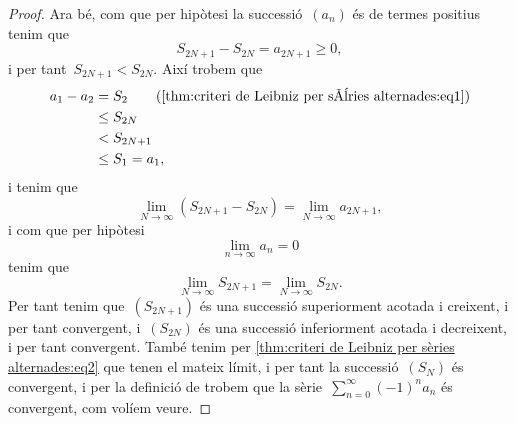 \documentclass[../../main.tex]{subfiles}
\begin{document}
\begin{theorem}
\begin{proof}
            Ara bé, com que per hipòtesi la successió~\((a_{n})\) és de termes positius tenim que
            \[
                S_{2N+1}-S_{2N}=a_{2N+1}\geq0,
            \]
            i per tant~\(S_{2N+1}<S_{2N}\).
            Així trobem que
            \begin{align*}
                a_{1}-a_{2}&=S_{2} \tag{\ref{thm:criteri de Leibniz per sèries alternades:eq1}} \\
                &\leq S_{2N} \\
                &< S_{2N+1} \\
                &\leq S_{1}=a_{1},
            \end{align*}
            i tenim que
            \[
                \lim_{N\to\infty}\left(S_{2N+1}-S_{2N}\right)=\lim_{N\to\infty}a_{2N+1},
            \]
            i com que per hipòtesi
            \[
                \lim_{n\to\infty}a_{n}=0
            \]
            tenim que
            \begin{equation}
                \label{thm:criteri de Leibniz per sèries alternades:eq2}
                \lim_{N\to\infty}S_{2N+1}=\lim_{N\to\infty}S_{2N}.
            \end{equation}
            Per tant tenim que~\((S_{2N+1})\) és una successió superiorment acotada i creixent, i per tant convergent, i~\((S_{2N})\) és una successió inferiorment acotada i decreixent, i per tant convergent.
            També tenim per \eqref{thm:criteri de Leibniz per sèries alternades:eq2} que tenen el mateix límit, i per tant la successió~\((S_{N})\) és convergent, i per la definició de  trobem que la sèrie~\(\sum_{n=0}^{\infty}(-1)^{n}a_{n}\) és convergent, com volíem veure.
        \end{proof}
    \end{theorem}
\end{document}
